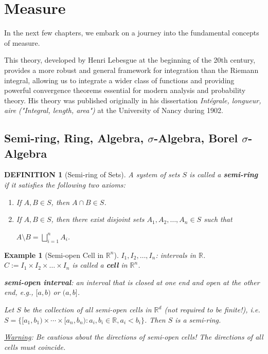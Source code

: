 \documentclass[12pt]{article}
\theoremstyle{blueplain}
\theoremstyle{bluedef}
\newtheorem{definition}{DEFINITION}[section]
\theoremstyle{blueremark}
\newtheorem{example}{Example}[section]
\newcommand{\R}{\mathbb{R}}
\numberwithin{equation}{section}
\begin{document}
      \clearpage





      \section{Measure}
      In the next few chapters, we embark on a journey into the fundamental concepts of measure.

      \noindent This theory, developed by Henri Lebesgue at the beginning of the 20th century, provides a more robust and general framework for integration than the Riemann integral, allowing us to integrate a wider class of functions and providing powerful convergence theorems essential for modern analysis and probability theory. His theory was published originally in his dissertation \textit{Intégrale, longueur, aire ("Integral, length, area")} at the University of Nancy during 1902.

      \clearpage

      \subsection{Semi-ring, Ring, Algebra, $\sigma$-Algebra, Borel $\sigma$-Algebra}

      \begin{definition}[Semi-ring of Sets]

        A system of sets $S$ is called a \textbf{semi-ring} if it satisfies the following two axioms:
        \begin{enumerate}
          \item If $A, B \in S$, then $A \cap B \in S$.
          \item If $A, B \in S$, then there exist disjoint sets $A_1, A_2, \ldots, A_n \in S$ such that

                $A \setminus B = \bigsqcup_{i=1}^n A_i$.
        \end{enumerate}
      \end{definition}

      \begin{example}[Semi-open Cell in $\R^n$]\index{Semi-open Cell in $\R^n$}

        $I_1, I_2, \ldots, I_n$: intervals in $\R$.
        $C:=I_1 \times I_2 \times \ldots \times I_n$ is called a \textbf{cell} in $\R^n$.

        \textbf{semi-open interval}: an interval that is closed at one end and open at the other end, e.g., $[a, b)$ or $(a, b]$.

        Let $S$ be the collection of all semi-open cells in $\R^d$ (not required to be finite!), i.e. $S = \{[a_1,b_1)\times\cdots\times[a_n,b_n): a_i,b_i\in\mathbb{R}, a_i<b_i\}$. Then $S$ is a semi-ring.

        \underline{Warning}: Be cautious about the directions of semi-open cells! The directions of all cells must coincide.
      \end{example}
\end{document}
